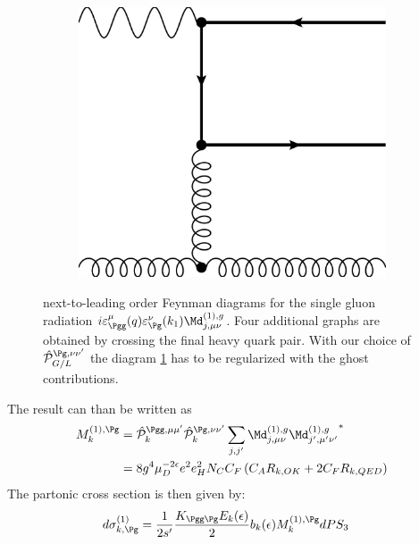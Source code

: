 \begin{figure}[ht!]
\begin{subfigure}[t]{.23\textwidth}
	\caption{}
\end{subfigure}\hspace{.02\textwidth}%
\begin{subfigure}[t]{.23\textwidth}
	\includegraphics[width=\textwidth]{pyfeyn/nlo-g-4}
	\caption{\label{fig:FeynNLOg3g}}
\end{subfigure}
\caption{next-to-leading order Feynman diagrams for the single gluon radiation $i\varepsilon_{\Pgg}^\mu(q) \varepsilon_{\Pg}^\nu(k_1)\Md^{(1),g}_{j,\mu\nu}$. Four additional graphs are obtained by crossing the final heavy quark pair. With our choice of $\hat {\mathcal P}_{G/L}^{\Pg,\nu\nu'}$ the diagram \ref{fig:FeynNLOg3g} has to be regularized with the ghost contributions. }\label{fig:FeynNLOg}
\end{figure}

The result can than be written as
\begin{align}
M_k^{(1),\Pg} &= \hat {\mathcal P}_{k}^{\Pgg,\mu\mu'}\hat {\mathcal P}_{k}^{\Pg,\nu\nu'}\sum_{j,j'}{\Md^{(1),g}_{j,\mu\nu}\Md^{(1),g}_{j',\mu'\nu'}}^*\\
 &= 8g^4\mu_D^{-2\epsilon}e^2e_H^2 N_C C_F\left( C_A R_{k,OK} + 2C_F R_{k,QED}\right)
\end{align}
The partonic cross section is then given by:
\begin{align}
d\sigma_{k,\Pg}^{(1)} &= \frac{1}{2s'}\frac {K_{\Pgg\Pg}E_k(\epsilon)} 2 b_k(\epsilon) M_k^{(1),\Pg} dPS_{3}
\end{align}

